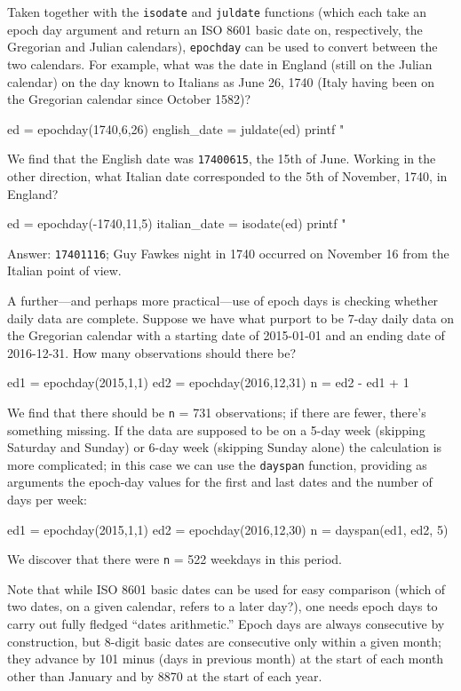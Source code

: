 Taken together with the \texttt{isodate} and \texttt{juldate}
functions (which each take an epoch day argument and return an ISO
8601 basic date on, respectively, the Gregorian and Julian calendars),
\texttt{epochday} can be used to convert between the two calendars.
For example, what was the date in England (still on the Julian
calendar) on the day known to Italians as June 26, 1740 (Italy having
been on the Gregorian calendar since October 1582)?
%
\begin{code}
ed = epochday(1740,6,26)
english_date = juldate(ed)
printf "%
\end{code}
%
We find that the English date was \texttt{17400615}, the 15th of June.
Working in the other direction, what Italian date corresponded to the
5th of November, 1740, in England?
%
\begin{code}
ed = epochday(-1740,11,5)
italian_date = isodate(ed)
printf "%
\end{code}
%
Answer: \texttt{17401116}; Guy Fawkes night in 1740 occurred on 
November 16 from the Italian point of view.

A further---and perhaps more practical---use of epoch days is checking
whether daily data are complete. Suppose we have what purport to be
7-day daily data on the Gregorian calendar with a starting date of
2015-01-01 and an ending date of 2016-12-31. How many observations
should there be?
%
\begin{code}
ed1 = epochday(2015,1,1)
ed2 = epochday(2016,12,31)
n = ed2 - ed1 + 1
\end{code}
We find that there should be \texttt{n} = 731 observations; if there
are fewer, there's something missing. If the data are supposed to be
on a 5-day week (skipping Saturday and Sunday) or 6-day week (skipping
Sunday alone) the calculation is more complicated; in this case we can
use the \texttt{dayspan} function, providing as arguments the
epoch-day values for the first and last dates and the number of days
per week:
\begin{code}
ed1 = epochday(2015,1,1)
ed2 = epochday(2016,12,30)
n = dayspan(ed1, ed2, 5)
\end{code}
%
We discover that there were \texttt{n} = 522 weekdays in this period.

Note that while ISO 8601 basic dates can be used for easy comparison
(which of two dates, on a given calendar, refers to a later day?), one
needs epoch days to carry out fully fledged ``dates arithmetic.''
Epoch days are always consecutive by construction, but 8-digit basic
dates are consecutive only within a given month; they advance by 101
minus (days in previous month) at the start of each month other than
January and by 8870 at the start of each year.

